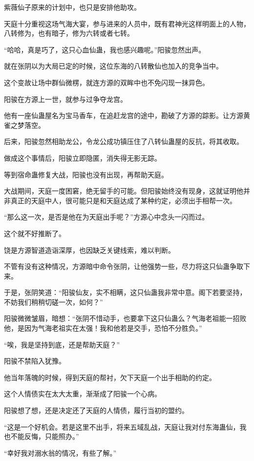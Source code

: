 \begin{this_body}
紫薇仙子原来的计划中，也只是安排他助攻。

天庭十分重视这场气海大宴，参与进来的人员中，既有君神光这样明面上的人物，八转修为，也有暗子，修为六转或者七转。

“哈哈，真是巧了，这只心血仙蛊，我也感兴趣呢。”阳骏忽然出声。

就在张阴以为大局已定的时候，这位东海的八转散仙也加入的竞争当中。

这个变故让场中群仙微楞，就连方源的双眸中也不免闪现一抹异色。

阳骏在方源上一世，就参与过争夺龙宫。

他有一座仙蛊屋名为宝马香车，在追赶龙宫的途中，勘破了方源的踪影。让方源黄雀之梦落空。

后来，阳骏忽然相助龙公，令龙公成功镇压住了八转仙蛊屋的反抗，将其收取。

做成这个事情后，阳骏立即隐匿，消失得无影无踪。

等到宿命蛊修复大战，阳骏也没有出现，再帮助天庭。

大战期间，天庭一度困窘，绝无留手的可能。但阳骏始终没有现身，这就证明他并非真正的天庭中人，很可能只是和天庭达成了某种约定，必须出手相帮一次。

“那么这一次，是否是他在为天庭出手呢？”方源心中念头一闪而过。

这个就不好推断了。

饶是方源智道造诣深厚，也因缺乏关键线索，难以判断。

不管有没有这种情况，方源暗中命令张阴，让他强势一些，尽力将这只仙蛊争取下来。

于是，张阴笑道：“阳骏仙友，实不相瞒，这只仙蛊我非常中意。阁下若要坚持，不妨我们稍稍切磋一次，如何？”

阳骏微微皱眉，暗想：“张阴不惜动手，也要拿下这只仙蛊么？气海老祖能一招败他，是因为气海老祖实在太强！我和他若是交手，恐怕不分胜负。”

“唉，我是坚持到底，还是帮助天庭？”

阳骏不禁陷入犹豫。

他当年落魄的时候，得到天庭的帮衬，欠下天庭一个出手相助的约定。

这个人情债实在太大太重，渐渐成了阳骏一个心病。

阳骏想了想，还是决定还了天庭的人情债，履行当初的盟约。

“这是一个好机会。若是这里不出手，将来五域乱战，天庭让我对付东海蛊仙，我也不能反悔，只能照办。”

“幸好我对溺水翁的情况，有些了解。”


\end{this_body}
